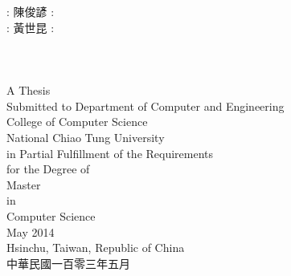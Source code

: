 \begin{titlepage}
\begin{center}
        \fontsize{22}{30pt}\selectfont \MZHTitle\\
        \fontsize{20}{30pt}\selectfont \MENTitle\\[1.0cm]

        \fontsize{16}{25pt}\selectfont
        \noindent
         : 陳俊諺 \makebox[150pt][c]{}
         : \\
         : 黃世昆\makebox[150pt][c]{}
         : \\[0.5cm]

        \fontsize{16}{30pt}\selectfont
        \\ \\
        \\

        \fontsize{12}{25pt}\selectfont
        A Thesis\\ Submitted to Department of Computer and Engineering\\
        College of Computer Science\\ National Chiao Tung University\\
        in Partial Fulfillment of the Requirements\\ for the Degree of \\ Master\\ in\\
        Computer Science\\
        May 2014\\
        Hsinchu, Taiwan, Republic of China\\
        \fontsize{16}{30pt}\selectfont 中華民國一百零三年五月
\end{center}
\end{titlepage}
